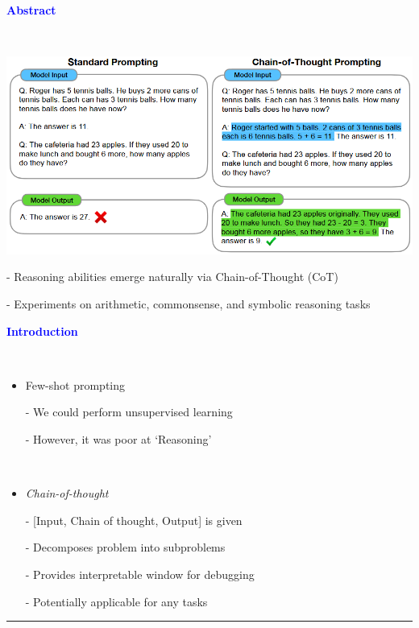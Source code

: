 \documentclass[professionalfont]{beamer}
\begin{document}
\begin{frame}
\begin{center}
    { \textbf{\textcolor{blue}{ {\fontsize{12}{14}\selectfont Abstract} }} }
\end{center}
\\[0.2cm]

\begin{center}
    \includegraphics[width=1.0\textwidth]{figure1.png}
\end{center}


{\fontsize{10}{14}\selectfont 
- Reasoning abilities emerge naturally via Chain-of-Thought (CoT)
    
- Experiments on arithmetic, commonsense, and symbolic reasoning tasks
}

\end{frame}

\begin{frame}
\begin{refsection}

\begin{center}
    { \textbf{\textcolor{blue}{ {\fontsize{12}{14}\selectfont Introduction} }} }
\end{center}
\\[0.5cm]

{\fontsize{10}{14}\selectfont 
\begin{itemize}
    \item Few-shot prompting \cite{gpt3}
    
    - We could perform unsupervised learning
    
    - However, it was poor at `Reasoning'

    \\[0.3cm]

    \item \textit{Chain-of-thought}

    - [Input, Chain of thought, Output] is given

    - Decomposes problem into subproblems

    - Provides interpretable window for debugging

    - Potentially applicable for any tasks
\end{itemize}
}

\vspace{0.3cm}
\hrule
\printbibliography

\end{refsection}
\end{frame}
\end{document}
